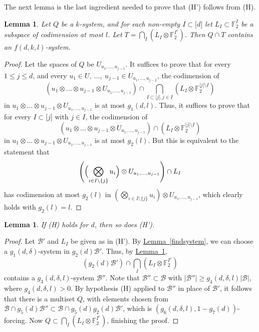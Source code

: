 \documentclass[11pt]{article}
\numberwithin{equation}{section}
\newtheorem{lemma}[theorem]{Lemma}
\theoremstyle{definition}
\theoremstyle{plain}
\newcommand{\expref}[2]{\hyperref[#2]{#1~\ref{#2}}}
\newcommand\F{\mathbb{F}}
\renewcommand\d{\delta}
\newcommand \cB{\mathcal B}
\newcommand \s{\subset}
\begin{document}
The next lemma is the last ingredient needed to prove that (H') follows from (H).

\begin{lemma} \label{systemspace}
	Let $Q$ be a $k$-system, and for each non-empty $I\s \lbrack d\rbrack$ let $L_I\s \F_2^{I}$ be a subspace of codimension at most $l$. Let $T=\bigcap_I(L_I\otimes \F_2^{I^c})$. Then $Q\cap T$ contains an $f(d,k,l)$-system.
\end{lemma}

\begin{proof}
  Let the spaces of $Q$ be $U_{u_1,\dots,u_{j-1}}$. It suffices to prove that for every $1\leq j\leq d$, and every $u_1\in U,\ \dots,\ u_{j-1}\in U_{u_1,\dots,u_{j-2}}$, the codimension of
  \[
    (u_1\otimes \dots\otimes u_{j-1}\otimes U_{u_1,\dots,u_{j-1}})\cap \bigcap_{I\subset \lbrack j\rbrack, j\in I}(L_I\otimes \F_2^{\lbrack j\rbrack \setminus I})
  \]
  in $u_1\otimes \dots\otimes u_{j-1}\otimes U_{u_1,\dots,u_{j-1}}$ is
  at most $g_1(d,l)$. Thus, it suffices to prove that for every
  $I\s \lbrack j\rbrack$ with $j\in I$, the codimension of
  \[
    (u_1\otimes \dots\otimes u_{j-1}\otimes
  U_{u_1,\dots,u_{j-1}})\cap(L_I\otimes \F_2^{\lbrack j\rbrack
    \setminus I})
\]
in $u_1\otimes \dots\otimes u_{j-1}\otimes U_{u_1,\dots,u_{j-1}}$ is
at most $g_2(l)$. But this is equivalent to the statement that
\[
  \Biggl(\Bigl(\bigotimes_{i\in I\setminus \{j\}}u_i\Bigr)\otimes
  U_{u_1,\dots,u_{j-1}}\Biggr)\cap L_I
\]
has codimension at most $g_2(l)$ in
$(\bigotimes_{i\in I\setminus \{j\}}u_i)\otimes
U_{u_1,\dots,u_{j-1}}$, which clearly holds with $g_2(l)=l$.
\end{proof}

\begin{lemma} \label{htoh'}
	If (H) holds for $d$, then so does (H').
\end{lemma}

\begin{proof}
  Let $\cB'$ and $L_I$ be given as in (H'). By \expref{Lemma}{findsystem}, we can choose a $g_1(d,\d)$-system in $g_2(d)\cB'$. Thus, by \expref{Lemma}{systemspace},
  \[
    (g_2(d)\cB')\cap\bigcap_I(L_I\otimes \F_2^{I^c})
  \]
  contains a $g_3(d,\d,l)$-system $\cB''$. Note that $\cB''\s \cB$
  with $|\cB''|\geq g_4(d,\d,l)|\cB|$, where $g_4(d,\d,l)>0$. By
  hypothesis (H) applied to $\cB''$ in place of $\cB'$, it follows
  that there is a multiset $Q$, with elements chosen from
  $\cB\cap g_5(d)\cB''\s \cB\cap g_5(d)g_2(d)\cB'$, which is
  $(g_6(d,\d,l),1-g_7(d))$-forcing. Now
  $Q\subset \bigcap_I(L_I\otimes \F_2^{I^c})$, finishing the proof.
\end{proof}
\end{document}
